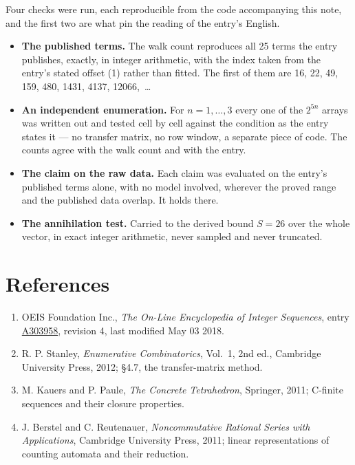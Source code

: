 \documentclass[11pt]{article}
\theoremstyle{definition}
\begin{document}
Four checks were run, each reproducible from the code accompanying this note, and the first two are what pin the reading of the entry's English.

\begin{itemize}

\item {\bfseries The published terms.} The walk count reproduces all 25 terms the entry publishes, exactly, in integer arithmetic, with the index taken from the entry's stated offset (1) rather than fitted. The first of them are 16, 22, 49, 159, 480, 1431, 4137, 12066,~\dots

\item {\bfseries An independent enumeration.} For $n = 1,\dots,3$ every one of the $2^{5n}$ arrays was written out and tested cell by cell against the condition as the entry states it --- no transfer matrix, no row window, a separate piece of code. The counts agree with the walk count and with the entry.

\item {\bfseries The claim on the raw data.} Each claim was evaluated on the entry's published terms alone, with no model involved, wherever the proved range and the published data overlap. It holds there.

\item {\bfseries The annihilation test.} Carried to the derived bound $S = 26$ over the whole vector, in exact integer arithmetic, never sampled and never truncated.

\end{itemize}

\section{References}

\begin{enumerate}

\item OEIS Foundation Inc., \emph{The On-Line Encyclopedia of Integer Sequences}, entry \href{https://oeis.org/A303958}{A303958}, revision 4, last modified May 03 2018.

\item R. P. Stanley, \emph{Enumerative Combinatorics}, Vol.~1, 2nd ed., Cambridge University Press, 2012; \S4.7, the transfer-matrix method.

\item M. Kauers and P. Paule, \emph{The Concrete Tetrahedron}, Springer, 2011; C-finite sequences and their closure properties.

\item J. Berstel and C. Reutenauer, \emph{Noncommutative Rational Series with Applications}, Cambridge University Press, 2011; linear representations of counting automata and their reduction.

\end{enumerate}
\end{document}
